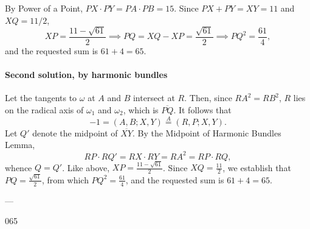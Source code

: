 By Power of a Point, $PX\cdot PY=PA\cdot PB=15$. Since $PX+PY=XY=11$ and $XQ=11/2$, \[XP=\frac{11-\sqrt{61}}2\implies PQ=XQ-XP=\frac{\sqrt{61}}2\implies PQ^2=\frac{61}4,\]
and the requested sum is $61+4=65$.

\paragraph{Second solution, by harmonic bundles} Let the tangents to $\omega$ at $A$ and $B$ intersect at $R$. Then, since $RA^2=RB^2$, $R$ lies on the radical axis of $\omega_1$ and $\omega_2$, which is $\overline{PQ}$. It follows that \[-1=(A,B;X,Y)\stackrel{A}{=}(R,P;X,Y).\]
    Let $Q'$ denote the midpoint of $\overline{XY}$. By the Midpoint of Harmonic Bundles Lemma, \[RP\cdot RQ'=RX\cdot RY=RA^2=RP\cdot RQ,\]
    whence $Q=Q'$. Like above, $XP=\frac{11-\sqrt{61}}2$. Since $XQ=\frac{11}2$, we establish that $PQ=\frac{\sqrt{61}}2$, from which $PQ^2=\frac{61}4$, and the requested sum is $61+4=65$.


---

065
